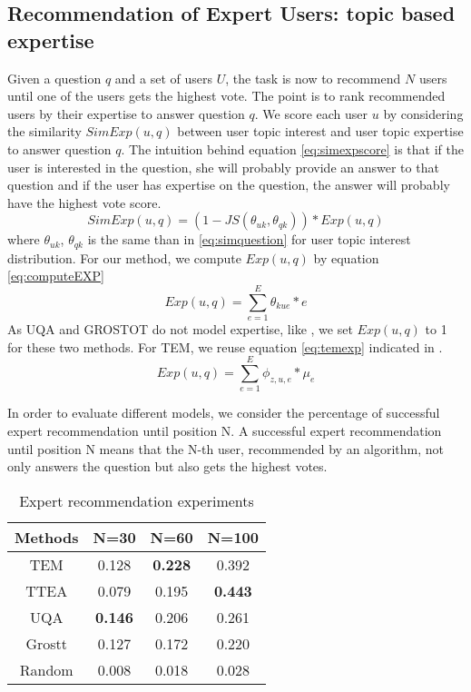 {{{{{{{%



\subsection{Recommendation of Expert Users: topic based expertise}
Given a question $q$ and a set of users $U$, the task is now to recommend $N$ users until one of the users gets the highest vote. The point is to rank recommended users by their expertise to answer question $q$.
We score each user $u$ by considering the similarity $SimExp(u,q)$ between user topic interest and user topic expertise to answer question $q$. The intuition behind equation \ref{eq:simexpscore} is that if the user is interested in the question, she will probably provide an answer to that question and if the user has expertise on the question, the answer will probably have the highest vote score. 
\begin{equation}
SimExp(u,q) = (1 -JS(\theta_{uk},\theta_{qk}))* Exp(u,q)
\label{eq:simexpscore}
\end{equation}
where $\theta_{uk}$, $\theta_{qk}$ is the same than in \ref{eq:simquestion} for user topic interest distribution. For our method, we compute $Exp(u,q)$ by equation \ref{eq:computeEXP}
\begin{equation}
Exp(u,q) =  \sum_{e=1}^{E} \theta_{kue} * e
\label{eq:computeEXP}
\end{equation}
As UQA and GROSTOT do not model expertise, like \cite{yang2013cqarank}, we set $Exp(u,q)$ to 1 for these two methods. For TEM, we reuse equation \ref{eq:temexp} indicated in \cite{yang2013cqarank}.
\begin{equation}
Exp(u,q) =  \sum_{e=1}^{E} \phi_{z,u,e}* \mu_e
\label{eq:temexp}
\end{equation}


In order to evaluate different models, we consider the percentage of successful expert recommendation until position N. A successful expert recommendation until position N means that the N-th user, recommended by an algorithm, not only answers the question but also gets the highest votes. 


\begin{table}[htp]
\caption{Expert recommendation experiments}
\label{tab:expertrec}
\centering
\begin{tabular}{|c|c|c|c|}
\hline
Methods& N=30 & N=60 & N=100 \\ \hline
TEM&0.128&\textbf{0.228}&0.392 \\ \hline
TTEA&0.079&0.195&\textbf{0.443} \\ \hline
UQA&\textbf{0.146}&0.206&0.261 \\ \hline
Grostt&0.127&0.172&0.220 \\ \hline
Random&0.008&0.018&0.028 \\ \hline
\end{tabular}
\end{table}

}}}}}}}
